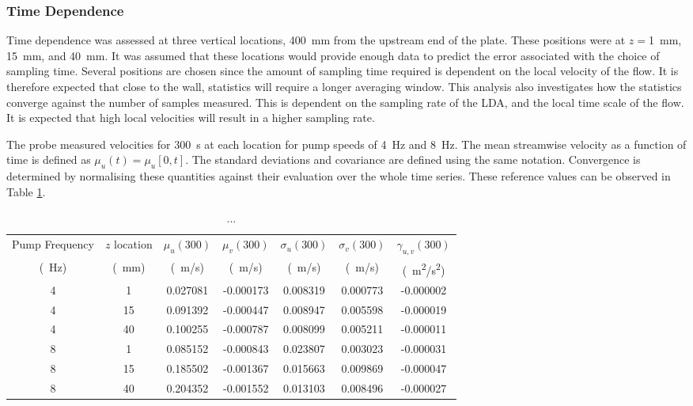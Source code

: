 \documentclass[12pt,oneside,a4paper]{article}
\begin{document}
\subsubsection{Time Dependence}
\label{section:experiments:timeDep}

Time dependence was assessed at three vertical locations, \SI{400}{mm} from the upstream end of the plate. These positions were at $z=$\SI{1}{mm}, \SI{15}{mm}, and \SI{40}{mm}. It was assumed that these locations would provide enough data to predict the error associated with the choice of sampling time. Several positions are chosen since the amount of sampling time required is dependent on the local velocity of the flow. It is therefore expected that close to the wall, statistics will require a longer averaging window. This analysis also investigates how the statistics converge against the number of samples measured. This is dependent on the sampling rate of the LDA, and the local time scale of the flow. It is expected that high local velocities will result in a higher sampling rate.

 The probe measured velocities for \SI{300}{s} at each location for pump speeds of \SI{4}{Hz} and \SI{8}{Hz}. The mean streamwise velocity as a function of time is defined as $\mu_u (t) = \mu_u[0,t]$. The standard deviations and covariance are defined using the same notation. Convergence is determined by normalising these quantities against their evaluation over the whole time series. These reference values can be observed in Table \ref{table:experiments:convergedStatistics}.
 \begin{table}[!h]
 \centering
 \caption{...}
 \label{table:experiments:convergedStatistics}
 \begin{tabular}{c c c c c c c}
 \hline
 Pump Frequency	&	$z$ location	&	$\mu_u(300)$	&	$\mu_v(300)$	&	$\sigma_u(300)$	&	$\sigma_v(300)$	&	$\gamma_{u,v}(300)$	\\
 \multicolumn{1}{c}{(\SI{}{Hz})}	&	\multicolumn{1}{c}{(\SI{}{mm})}	&	\multicolumn{1}{c}{(\SI{}{m/s})}	&	\multicolumn{1}{c}{(\SI{}{m/s})}	&	\multicolumn{1}{c}{(\SI{}{m/s})}	& \multicolumn{1}{c}{(\SI{}{m/s})}	& \multicolumn{1}{c}{(\SI{}{m^2/s^2})}	\\
%
\hline
4	&	1	&	0.027081	&	-0.000173	&	0.008319	&	0.000773	&	-0.000002	\\
4	&	15	&	0.091392	&	-0.000447	&	0.008947	&	0.005598	&	-0.000019	\\
4	&	40	&	0.100255	&	-0.000787	&	0.008099	&	0.005211	&	-0.000011	\\
8	&	1	&	0.085152	&	-0.000843	&	0.023807	&	0.003023	&	-0.000031	\\
8	&	15	&	0.185502	&	-0.001367	&	0.015663	&	0.009869	&	-0.000047	\\
8	&	40	&	0.204352	&	-0.001552	&	0.013103	&	0.008496	&	-0.000027	\\
\hline
 
 \end{tabular}
 \end{table}
\end{document}
